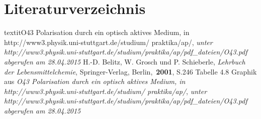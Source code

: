 \documentclass[fontsize=12pt]{scrartcl}
\begin{document}
\section{Literaturverzeichnis}

\begin{thebibliography}{xxxx}
		textit{\glqq O43 Polarisation durch ein optisch aktives Medium\grqq , in http://www3.physik.uni-stuttgart.de/studium/	
    						praktika/ap/}, \textit{ unter 	http://www3.physik.uni-stuttgart.de/studium/praktika/ap/pdf\_dateien/O43.pdf abgerufen am 28.04.2015}
      	H.-D. Belitz, W. Grosch und P. Schieberle, \textit{ Lehrbuch der Lebensmittelchemie}, Springer-Verlag, Berlin,~\textbf{2001}, S.246 				                        Tabelle 4.8
      Graphik aus \textit{\glqq O43 Polarisation durch ein optisch aktives Medium\grqq , in http://www3.physik.uni-stuttgart.de/studium/	
    							praktika/ap/}, \textit{ unter 	http://www3.physik.uni-stuttgart.de/studium/praktika/ap/pdf\_dateien/O43.pdf abgerufen am 28.04.2015}
\end{thebibliography}
\newpage
\end{document}
